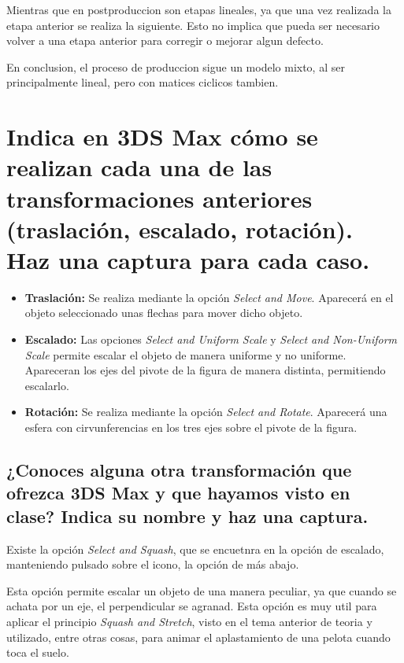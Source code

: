 \documentclass{article}
\begin{document}
Mientras que en postproduccion son etapas lineales, ya que una vez realizada la etapa anterior se realiza la siguiente. Esto no implica que pueda ser necesario volver a una etapa anterior para corregir o mejorar algun defecto.

En conclusion, el proceso de produccion sigue un modelo mixto, al ser principalmente lineal, pero con matices ciclicos tambien.

\section{Indica en 3DS Max cómo se realizan cada una de las transformaciones anteriores (traslación, escalado, rotación). Haz una captura para cada caso.}

\begin{itemize}
    \item \textbf{Traslación: }Se realiza mediante la opción \textit{Select and Move}. Aparecerá en el objeto seleccionado unas flechas para mover dicho objeto.
    
    
    \item \textbf{Escalado: }Las opciones \textit{Select and Uniform Scale} y \textit{Select and Non-Uniform Scale} permite escalar el objeto de manera uniforme y no uniforme. Apareceran los ejes del pivote de la figura de manera distinta, permitiendo escalarlo.
    

    \item \textbf{Rotación: }Se realiza mediante la opción \textit{Select and Rotate}. Aparecerá una esfera con cirvunferencias en los tres ejes sobre el pivote de la figura.
    
\end{itemize}

\subsection{¿Conoces alguna otra transformación que ofrezca 3DS Max y que hayamos visto en clase? Indica su nombre y haz una captura.}

Existe la opción \textit{Select and Squash}, que se encuetnra en la opción de escalado, manteniendo pulsado sobre el icono, la opción de más abajo.


Esta opción permite escalar un objeto de una manera peculiar, ya que cuando se achata por un eje, el perpendicular se agranad. Esta opción es muy util para aplicar el principio \textit{Squash and Stretch}, visto en el tema anterior de teoria y utilizado, entre otras cosas, para animar el aplastamiento de una pelota cuando toca el suelo.
\end{document}
